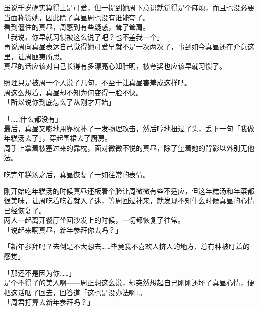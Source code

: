 虽说千岁确实算得上是可爱，但一提到她周下意识就觉得是个麻烦，而且也没必要当面称赞她，因此除了真昼周也没有谁能夸了。\\

看到僵住的真昼，周感到有些疑惑，耸了耸肩。\\

「我说，你早就习惯被这么说了吧？也不差我一个」\\

再说周向真昼表达自己觉得她可爱早就不是一次两次了，事到如今真昼还在介意这里，让周匪夷所思。\\

真昼的话应该对自己长得有多漂亮心知肚明，被夸奖也应该早就习惯了。

照理只是被周一个人说了几句，不至于让真昼害羞成这样吧。\\

周这么想着，真昼却不知为何变得一脸不快。\\

「所以说你到底怎么了从刚才开始」

「……什么都没有」\\

最后，真昼又嘭地用靠枕补了一发物理攻击，然后哼地扭过了头，丢下一句「我做年糕汤去了」，穿起围裙去了厨房。\\

周手上拿着被塞过来的靠枕，面对微微不悦的真昼，除了望着她的背影以外别无他法。\\

\vspace{2\baselineskip}

吃完年糕汤之后，真昼恢复了一如往常的表情。

刚开始吃年糕汤的时候真昼还板着个脸让周微微有些不适应，但这年糕汤和年菜都很美味，让周吃着吃着就入了迷，等周回过神来，就发现不知什么时候真昼的心情已经恢复了。\\

两人一起离开餐厅坐回沙发上的时候，一切都恢复了往常。\\

「说起来啊真昼，新年参拜你去吗？」

「新年参拜吗？去倒是不大想去……毕竟我不喜欢人挤人的地方，总有种被盯着的感觉」

「那还不是因为你……」\\

是个不得了的美人啊——周正想这么说，却突然想起自己刚刚还坏了真昼心情，便把这话咽了回去，回答道「这也是没办法啊」。\\

「周君打算去新年参拜吗？」

